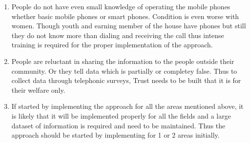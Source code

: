 \begin {enumerate}
\item  People do not have even small knowledge of operating the mobile phones
whether basic mobile phones or smart phones. Condition is even worse with
women. Though youth and earning member of the house have phones but
still they do not know more than dialing and receiving the call thus intense
training is required for the proper implementation of the approach.
\item  People are reluctant in sharing the information to the people outside their
community. Or they tell data which is partially or completey false. Thus to
collect data through telephonic surveys, Trust needs to be built that it is for
their welfare only.
\item If started by implementing the approach for all the areas mentioned above, it is likely that it will be implemented properly for all the fields and a large dataset of information is required and need to be maintained. Thus the approach should be started by implementing for 1 or 2 areas initially.
\end {enumerate}

